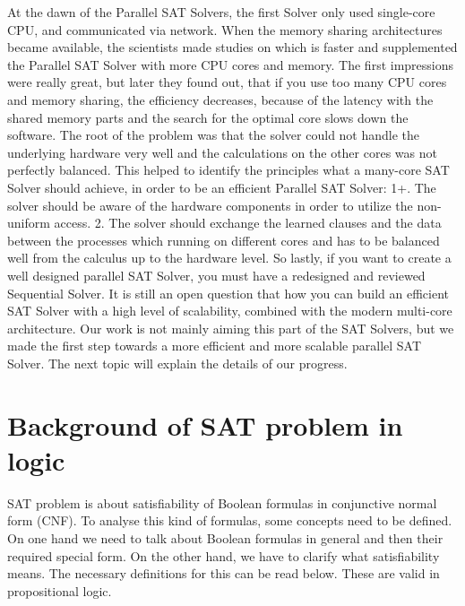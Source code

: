 \documentclass{article}
\begin{document}
At the dawn of the Parallel SAT Solvers, the first Solver only used single-core CPU, and communicated via network. When the memory sharing architectures became available, the scientists made studies on which is faster and supplemented the Parallel SAT Solver with more CPU cores and memory. The first impressions were really great, but later they found out, that if you use too many CPU cores and memory sharing, the efficiency decreases, because of the latency with the shared memory parts and the search for the optimal core slows down the software. The root of the problem was that the solver could not handle the underlying hardware very well and the calculations on the other cores was not perfectly balanced. This helped to identify the principles what a many-core SAT Solver should achieve, in order to be an efficient Parallel SAT Solver:
1+. The solver should be aware of the hardware components in order to utilize the non-uniform access.
2. The solver should exchange the learned clauses and the data between the processes which running on different cores and has to be balanced well from the calculus up to the hardware level.
So lastly, if you want to create a well designed parallel SAT Solver, you must have a redesigned and reviewed Sequential Solver. It is still an open question that how you can build an efficient SAT Solver with a high level of scalability, combined with the modern multi-core architecture.
Our work is not mainly aiming this part of the SAT Solvers, but we made the first step towards a more efficient and more scalable parallel SAT Solver. The next topic will explain the details of our progress.\cite{OverviewSAT}

\section{Background of SAT problem in logic}
\label{sec:background}

SAT problem is about satisfiability of Boolean formulas in conjunctive normal form (CNF). To analyse this kind of formulas, some concepts need to be defined. On one hand we need to talk about Boolean formulas in general and then their required special form. On the other hand, we have to clarify what satisfiability means. The necessary definitions for this can be read below. These are valid in propositional logic.
\end{document}
